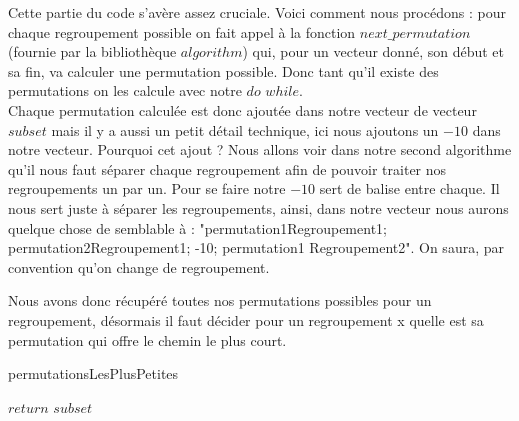\documentclass[a4paper,sffamily,12pt]{article}
\begin{document}
			Cette partie du code s'avère assez cruciale. Voici comment nous procédons : pour chaque regroupement possible on fait appel à la fonction $next\_permutation$ (fournie par la bibliothèque $algorithm$) qui, pour un vecteur donné, son début et sa fin, va calculer une permutation possible. Donc tant qu'il existe des permutations on les calcule avec notre $do$ $while$.\\
			\indent Chaque permutation calculée est donc ajoutée dans notre vecteur de vecteur $subset$ mais il y a aussi un petit détail technique, ici nous ajoutons un $-10$ dans notre vecteur. Pourquoi cet ajout ? Nous allons voir dans notre second algorithme qu'il nous faut séparer chaque regroupement afin de pouvoir traiter nos regroupements un par un. Pour se faire notre $-10$ sert de balise entre chaque. Il nous sert juste à séparer les regroupements, ainsi, dans notre vecteur nous aurons quelque chose de semblable à : "permutation1Regroupement1; permutation2Regroupement1; -10; permutation1 Regroupement2". On saura, par convention qu'on change de regroupement. 

			\newpage
			
			 Nous avons donc récupéré toutes nos permutations possibles pour un regroupement, désormais il faut décider pour un regroupement x quelle est sa permutation qui offre le chemin le plus court.

			\IncMargin{1em}
			\begin{algorithm}
				\caption{permutationsLesPlusPetites}				
				\BlankLine
				
				$return$ $subset$ \\
			\end{algorithm}\DecMargin{1em}
\end{document}
